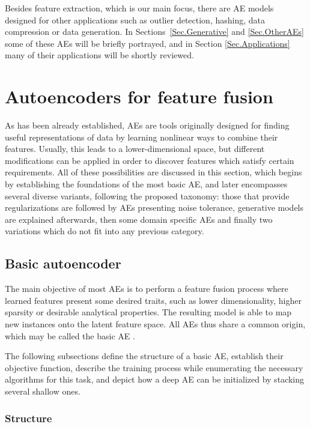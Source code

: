 Besides feature extraction, which is our main focus, there are AE models designed for other applications such as outlier detection, hashing, data compression or data generation. In Sections~\ref{Sec.Generative} and \ref{Sec.OtherAEs} some of these AEs will be briefly portrayed, and in Section \ref{Sec.Applications} many of their applications will be shortly reviewed. 


\section{Autoencoders for feature fusion}\label{Sect.AEforFF}

As has been already established, AEs are tools originally designed for finding useful representations of data by learning nonlinear ways to combine their features. Usually, this leads to a lower-dimensional space, but different modifications can be applied in order to discover features which satisfy certain requirements. All of these possibilities are discussed in this section, which begins by establishing the foundations of the most basic AE, and later encompasses several diverse variants, following the proposed taxonomy: those that provide regularizations are followed by AEs presenting noise tolerance, generative models are explained afterwards, then some domain specific AEs and finally two variations which do not fit into any previous category.

\subsection{Basic autoencoder}\label{Sec.BasicAE}

The main objective of most AEs is to perform a feature fusion process where learned features present some desired traits, such as lower dimensionality, higher sparsity or desirable analytical properties. The resulting model is able to map new instances onto the latent feature space. All AEs thus share a common origin, which may be called the basic AE \cite{bourlard_auto-association_1988}.

The following subsections define the structure of a basic AE, establish their objective function, describe the training process while enumerating the necessary algorithms for this task, and depict how a deep AE can be initialized by stacking several shallow ones.


\subsubsection{Structure}

